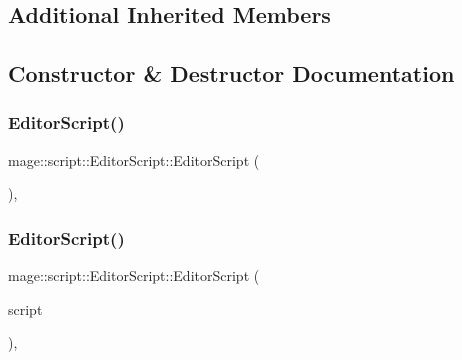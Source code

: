 \subsection*{Additional Inherited Members}


\subsection{Constructor \& Destructor Documentation}
\hypertarget{classmage_1_1script_1_1_editor_script_a6a16b52ab1952669a597abab1d66a73d}{}\label{classmage_1_1script_1_1_editor_script_a6a16b52ab1952669a597abab1d66a73d} 
\subsubsection{\texorpdfstring{Editor\+Script()}{EditorScript()}\hspace{0.1cm}{\footnotesize\ttfamily [1/3]}}
{\footnotesize\ttfamily mage\+::script\+::\+Editor\+Script\+::\+Editor\+Script (\begin{DoxyParamCaption}{ }\end{DoxyParamCaption})\hspace{0.3cm}{\ttfamily [default]}, {\ttfamily [noexcept]}}

\hypertarget{classmage_1_1script_1_1_editor_script_adfe05bb0529f098c404c25326ef0fd2e}{}\label{classmage_1_1script_1_1_editor_script_adfe05bb0529f098c404c25326ef0fd2e} 
\subsubsection{\texorpdfstring{Editor\+Script()}{EditorScript()}\hspace{0.1cm}{\footnotesize\ttfamily [2/3]}}
{\footnotesize\ttfamily mage\+::script\+::\+Editor\+Script\+::\+Editor\+Script (\begin{DoxyParamCaption}\item[{const \hyperlink{classmage_1_1script_1_1_editor_script}{Editor\+Script} \&}]{script }\end{DoxyParamCaption})\hspace{0.3cm}{\ttfamily [default]}, {\ttfamily [noexcept]}}

